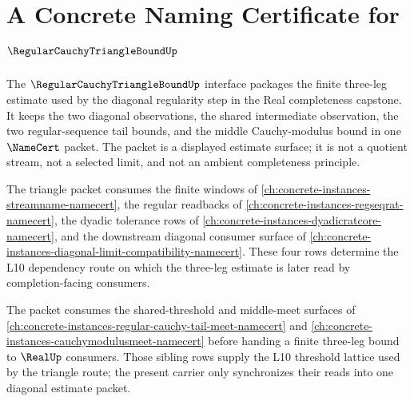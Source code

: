 \chapter{A Concrete Naming Certificate for $\RegularCauchyTriangleBoundUp$}
\label{ch:concrete-instances-regular-cauchy-triangle-bound-namecert}

The $\RegularCauchyTriangleBoundUp$ interface packages the finite three-leg estimate used by the diagonal regularity step in the Real completeness capstone. It keeps the two diagonal observations, the shared intermediate observation, the two regular-sequence tail bounds, and the middle Cauchy-modulus bound in one $\NameCert$ packet. The packet is a displayed estimate surface; it is not a quotient stream, not a selected limit, and not an ambient completeness principle.

The triangle packet consumes the finite windows of \autoref{ch:concrete-instances-streamname-namecert}, the regular readbacks of \autoref{ch:concrete-instances-regseqrat-namecert}, the dyadic tolerance rows of \autoref{ch:concrete-instances-dyadicratcore-namecert}, and the downstream diagonal consumer surface of \autoref{ch:concrete-instances-diagonal-limit-compatibility-namecert}. These four rows determine the L10 dependency route on which the three-leg estimate is later read by completion-facing consumers.

The packet consumes the shared-threshold and middle-meet surfaces of \autoref{ch:concrete-instances-regular-cauchy-tail-meet-namecert} and \autoref{ch:concrete-instances-cauchymodulusmeet-namecert} before handing a finite three-leg bound to $\RealUp$ consumers. Those sibling rows supply the L10 threshold lattice used by the triangle route; the present carrier only synchronizes their reads into one diagonal estimate packet.

